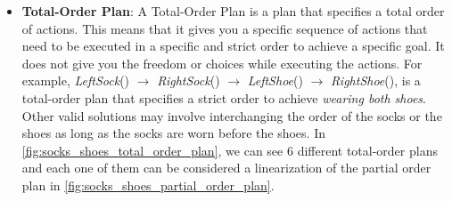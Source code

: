 \begin{itemize}
      \item \label{def:total_order_plan}
            \textbf{Total-Order Plan}: A Total-Order Plan is a plan that specifies a total order of actions. This means that it gives you a specific sequence of actions that need to be executed in a specific and strict order to achieve a specific goal. It does not give you the freedom or choices while executing the actions. For example, \textit{LeftSock}() $\rightarrow$ \textit{RightSock}() $\rightarrow$ \textit{LeftShoe}() $\rightarrow$ \textit{RightShoe}(), is a total-order plan that specifies a strict order to achieve \textit{wearing both shoes}. Other valid solutions may involve interchanging the order of the socks or the shoes as long as the socks are worn before the shoes. In \autoref{fig:socks_shoes_total_order_plan}, we can see 6 different total-order plans and each one of them can be considered a linearization of the partial order plan in \autoref{fig:socks_shoes_partial_order_plan}.
            \begin{figure}[ht]
                  \centering

\end{figure}
\end{itemize}
